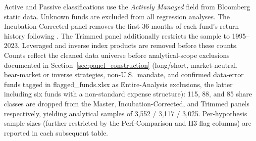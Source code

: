 \begin{table}[H]
\centering
{}
\setlength{\tabletempwidth}{\wd\tabletempbox}
\ifdim\tabletempwidth>\linewidth\setlength{\tabletempwidth}{\linewidth}\fi
\begin{minipage}{\tabletempwidth}
\captionsetup{width=\linewidth}
\caption{\label{tab:fund_counts}Fund Sample Composition by Panel}
\ifdim\wd\tabletempbox>\linewidth
  \resizebox{\linewidth}{!}{\usebox{\tabletempbox}}
\else
  \usebox{\tabletempbox}
\fi
\par\medskip
\begin{singlespace}\footnotesize\noindent
Active and Passive classifications use the \textit{Actively Managed} field from Bloomberg static data. Unknown funds are excluded from all regression analyses. The Incubation-Corrected panel removes the first 36 months of each fund's return history following \textcite{Evans2010}. The Trimmed panel additionally restricts the sample to 1995--2023. Leveraged and inverse index products are removed before these counts. Counts reflect the cleaned data universe before analytical-scope exclusions documented in Section~\ref{sec:panel_construction} (long/short, market-neutral, bear-market or inverse strategies, non-U.S.\ mandate, and confirmed data-error funds tagged in flagged\_funds.xlsx as Entire-Analysis exclusions, the latter including six funds with a non-standard expense structure): 115, 88, and 85 share classes are dropped from the Master, Incubation-Corrected, and Trimmed panels respectively, yielding analytical samples of 3,552 / 3,117 / 3,025. Per-hypothesis sample sizes (further restricted by the Perf-Comparison and H3 flag columns) are reported in each subsequent table.
\end{singlespace}
\end{minipage}
\end{table}

